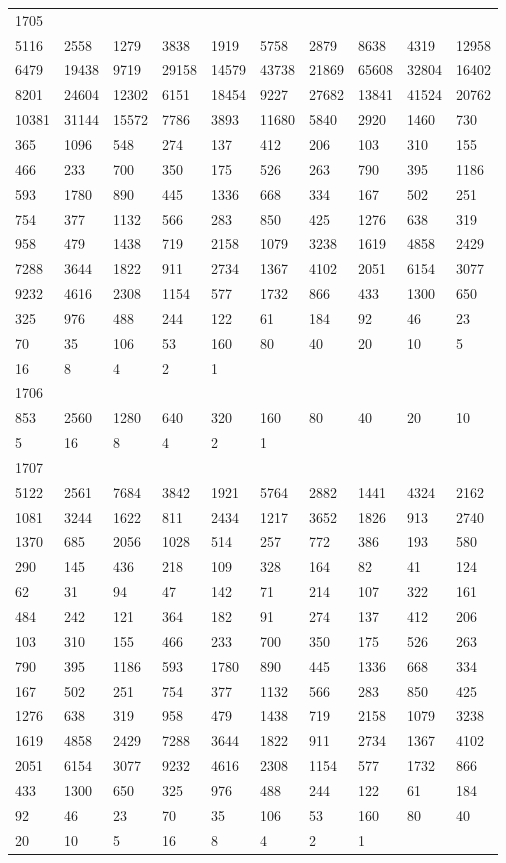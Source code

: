 \begin{longtable}{*{10}{l}}
1705&&&&&&&&&\\
5116& 2558& 1279& 3838& 1919& 5758& 2879& 8638& 4319& 12958\\
6479& 19438& 9719& 29158& 14579& 43738& 21869& 65608& 32804& 16402\\
8201& 24604& 12302& 6151& 18454& 9227& 27682& 13841& 41524& 20762\\
10381& 31144& 15572& 7786& 3893& 11680& 5840& 2920& 1460& 730\\
365& 1096& 548& 274& 137& 412& 206& 103& 310& 155\\
466& 233& 700& 350& 175& 526& 263& 790& 395& 1186\\
593& 1780& 890& 445& 1336& 668& 334& 167& 502& 251\\
754& 377& 1132& 566& 283& 850& 425& 1276& 638& 319\\
958& 479& 1438& 719& 2158& 1079& 3238& 1619& 4858& 2429\\
7288& 3644& 1822& 911& 2734& 1367& 4102& 2051& 6154& 3077\\
9232& 4616& 2308& 1154& 577& 1732& 866& 433& 1300& 650\\
325& 976& 488& 244& 122& 61& 184& 92& 46& 23\\
70& 35& 106& 53& 160& 80& 40& 20& 10& 5\\
16& 8& 4& 2& 1& \\

1706&&&&&&&&&\\
853& 2560& 1280& 640& 320& 160& 80& 40& 20& 10\\
5& 16& 8& 4& 2& 1& \\

1707&&&&&&&&&\\
5122& 2561& 7684& 3842& 1921& 5764& 2882& 1441& 4324& 2162\\
1081& 3244& 1622& 811& 2434& 1217& 3652& 1826& 913& 2740\\
1370& 685& 2056& 1028& 514& 257& 772& 386& 193& 580\\
290& 145& 436& 218& 109& 328& 164& 82& 41& 124\\
62& 31& 94& 47& 142& 71& 214& 107& 322& 161\\
484& 242& 121& 364& 182& 91& 274& 137& 412& 206\\
103& 310& 155& 466& 233& 700& 350& 175& 526& 263\\
790& 395& 1186& 593& 1780& 890& 445& 1336& 668& 334\\
167& 502& 251& 754& 377& 1132& 566& 283& 850& 425\\
1276& 638& 319& 958& 479& 1438& 719& 2158& 1079& 3238\\
1619& 4858& 2429& 7288& 3644& 1822& 911& 2734& 1367& 4102\\
2051& 6154& 3077& 9232& 4616& 2308& 1154& 577& 1732& 866\\
433& 1300& 650& 325& 976& 488& 244& 122& 61& 184\\
92& 46& 23& 70& 35& 106& 53& 160& 80& 40\\
20& 10& 5& 16& 8& 4& 2& 1& \\


\end{longtable}

